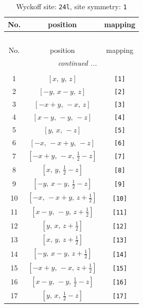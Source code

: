 \documentclass[fleqn,8pt]{jsarticle}
\begin{document}
\begin{longtable}{ccc}
\caption{Wyckoff site: {\tt 24l}, site symmetry: {\tt 1}}
 \\
 \hline \hline
No. & position & mapping \\ \hline \endfirsthead

\multicolumn{2}{l}{\tablename\ \thetable{}} \\
 \hline \hline
No. & position & mapping \\ \hline \endhead

 \hline \hline
\multicolumn{2}{r}{\footnotesize\it continued ...} \\ \endfoot

 \hline \hline
\multicolumn{2}{r}{} \\ \endlastfoot

1 & $\left[ x,\, y,\, z \right]$ & {\tt [1]} \\ \hline
2 & $\left[ - y,\, x - y,\, z \right]$ & {\tt [2]} \\ \hline
3 & $\left[ - x + y,\, - x,\, z \right]$ & {\tt [3]} \\ \hline
4 & $\left[ x - y,\, - y,\, - z \right]$ & {\tt [4]} \\ \hline
5 & $\left[ y,\, x,\, - z \right]$ & {\tt [5]} \\ \hline
6 & $\left[ - x,\, - x + y,\, - z \right]$ & {\tt [6]} \\ \hline
7 & $\left[ - x + y,\, - x,\, \frac{1}{2} - z \right]$ & {\tt [7]} \\ \hline
8 & $\left[ x,\, y,\, \frac{1}{2} - z \right]$ & {\tt [8]} \\ \hline
9 & $\left[ - y,\, x - y,\, \frac{1}{2} - z \right]$ & {\tt [9]} \\ \hline
10 & $\left[ - x,\, - x + y,\, z + \frac{1}{2} \right]$ & {\tt [10]} \\ \hline
11 & $\left[ x - y,\, - y,\, z + \frac{1}{2} \right]$ & {\tt [11]} \\ \hline
12 & $\left[ y,\, x,\, z + \frac{1}{2} \right]$ & {\tt [12]} \\ \hline
13 & $\left[ x,\, y,\, z + \frac{1}{2} \right]$ & {\tt [13]} \\ \hline
14 & $\left[ - y,\, x - y,\, z + \frac{1}{2} \right]$ & {\tt [14]} \\ \hline
15 & $\left[ - x + y,\, - x,\, z + \frac{1}{2} \right]$ & {\tt [15]} \\ \hline
16 & $\left[ x - y,\, - y,\, \frac{1}{2} - z \right]$ & {\tt [16]} \\ \hline
17 & $\left[ y,\, x,\, \frac{1}{2} - z \right]$ & {\tt [17]} \\ \hline

\end{longtable}
\end{document}
